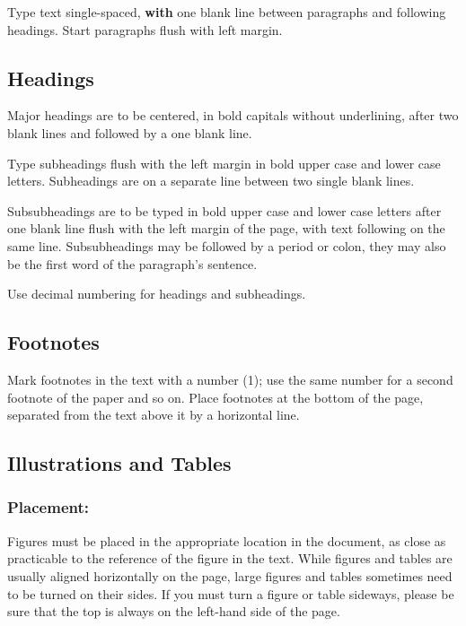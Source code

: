 \documentclass{isprs} %
\begin{document}
Type text single-spaced, \textbf{with} one blank line between paragraphs and 
following headings. Start paragraphs flush with left margin.


\subsection{Headings}\label{sec:Headings}

Major headings are to be centered, in bold capitals without 
underlining, after two blank lines and followed by a one blank line.

Type subheadings flush with the left margin in bold upper case and lower 
case letters. Subheadings are on a separate line between two single blank lines.

Subsubheadings are to be typed in bold upper case and lower case letters 
after one blank line flush with the left margin of the page, with text 
following on the same line. Subsubheadings may be followed by a period 
or colon, they may also be the first word of the paragraph's sentence.

Use decimal numbering for headings and subheadings.


\subsection{Footnotes}\label{sec:Footnotes}

Mark footnotes in the text with a number (1); use the same number for a 
second footnote of the paper and so on. Place footnotes at the bottom of 
the page, separated from the text above it by a horizontal line.


\subsection{Illustrations and Tables}\label{sec:Illustrations and Tables}

\subsubsection{Placement:}\label{sec:Placement}

Figures must be placed in the appropriate location in the document, 
as close as practicable to the reference of the figure in the text. 
While figures and tables are usually aligned horizontally on the page, 
large figures and tables sometimes need to be turned on their sides. 
If you must turn a figure or table sideways, please be sure that the 
top is always on the left-hand side of the page.
\end{document}
